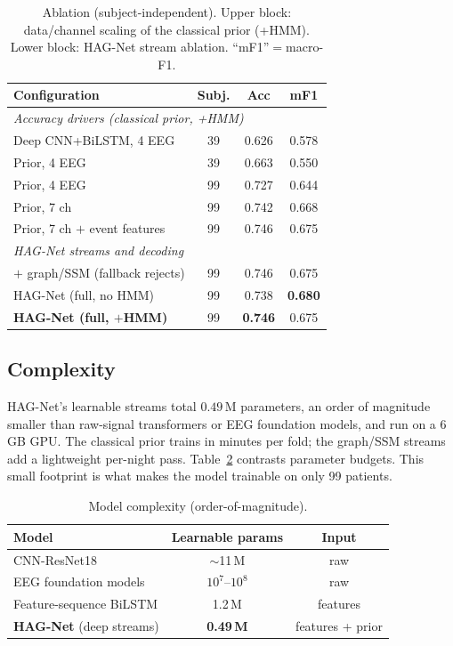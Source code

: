 \documentclass[journal]{IEEEtran}
\newcommand{\hagAccR}{0.738}   %
\newcommand{\hagMfR}{0.680}    %
\newcommand{\hagAccH}{0.746}   %
\newcommand{\hagMfH}{0.675}    %
\begin{document}
\begin{table}[t]
\caption{Ablation (subject-independent). Upper block: data/channel scaling of the
classical prior (+HMM). Lower block: HAG-Net stream ablation. ``mF1''$=$macro-F1.}
\label{tab:ablation}
\centering
\setlength{\tabcolsep}{4pt}
\begin{tabular}{lccc}
\toprule
Configuration & Subj. & Acc & mF1 \\
\midrule
\multicolumn{4}{l}{\emph{Accuracy drivers (classical prior, +HMM)}}\\
Deep CNN+BiLSTM, 4 EEG           & 39 & 0.626 & 0.578 \\
Prior, 4 EEG                     & 39 & 0.663 & 0.550 \\
Prior, 4 EEG                     & 99 & 0.727 & 0.644 \\
Prior, 7 ch                      & 99 & 0.742 & 0.668 \\
Prior, 7 ch $+$ event features   & 99 & 0.746 & 0.675 \\
\midrule
\multicolumn{4}{l}{\emph{HAG-Net streams and decoding}}\\
$+$ graph/SSM (fallback rejects) & 99 & 0.746 & 0.675 \\
HAG-Net (full, no HMM)           & 99 & \hagAccR & \textbf{\hagMfR} \\
\textbf{HAG-Net (full, $+$HMM)}  & 99 & \textbf{\hagAccH} & \hagMfH \\
\bottomrule
\end{tabular}
\end{table}

\subsection{Complexity}
HAG-Net's learnable streams total $0.49$\,M parameters, an order of magnitude
smaller than raw-signal transformers or EEG foundation models, and run on a 6\,GB
GPU. The classical prior trains in minutes per fold; the graph/SSM streams add a
lightweight per-night pass. Table~\ref{tab:complexity} contrasts parameter budgets.
This small footprint is what makes the model trainable on only 99 patients.

\begin{table}[t]
\caption{Model complexity (order-of-magnitude).}
\label{tab:complexity}
\centering
\setlength{\tabcolsep}{4pt}
\begin{tabular}{lcc}
\toprule
Model & Learnable params & Input \\
\midrule
CNN-ResNet18~\cite{maiti2026isleeps} & $\sim$11\,M & raw \\
EEG foundation models~\cite{labram2024,cbramod2025} & $10^{7}$--$10^{8}$ & raw \\
Feature-sequence BiLSTM & 1.2\,M & features \\
\textbf{HAG-Net} (deep streams) & \textbf{0.49\,M} & features + prior \\
\bottomrule
\end{tabular}
\end{table}
\end{document}

